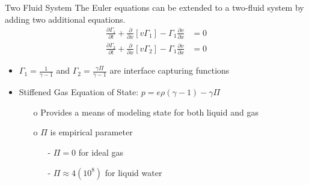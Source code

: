 \documentclass[10pt]{beamer}
\begin{document}
\begin{frame}{Two Fluid System}
  The Euler equations can be extended to a two-fluid system by adding two additional equations.
  \begin{align}
    \frac{\partial \Gamma_1 }{\partial t} + \frac{\partial}{\partial x}[v\Gamma_1] - \Gamma_1 \frac{\partial v}{\partial x}&=0\label{eq: Order Parameter One}\\
    \frac{\partial \Gamma_2 }{\partial t} + \frac{\partial}{\partial x}[v\Gamma_2] - \Gamma_1 \frac{\partial v}{\partial x}&=0\label{eq: Order Parameter Two}
  \end{align}

  \begin{itemize}
    \item $\Gamma_1 = \frac{1}{\gamma -1}$ and $\Gamma_2 = \frac{\gamma \Pi}{\gamma -1}$ are interface capturing functions
    \item Stiffened Gas Equation of State: $p = e\rho(\gamma - 1) -\gamma \Pi$
    \begin{itemize}
      \item[o] Provides a means of modeling state for both liquid and gas 
      \item[o] $\Pi$ is empirical parameter
      \begin{itemize}
        \item [-] $\Pi = 0$ for ideal gas
        \item [-] $\Pi \approx 4(10^8)$ for liquid water
      \end{itemize}    
    \end{itemize}
  \end{itemize}

\end{frame}

\end{document}
